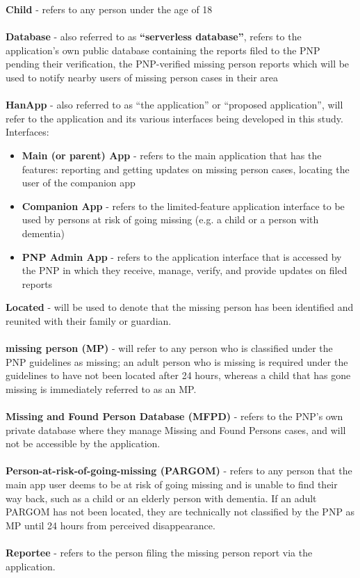 \textbf{Child} - refers to any person under the age of 18 \\ \\ 
\textbf{Database} - also referred to as \textbf{“serverless database”}, refers to the application’s own public database containing the reports filed to the PNP pending their verification, the PNP-verified missing person reports which will be used to notify nearby users of missing person cases in their area \\ \\
\textbf{HanApp} - also referred to as “the application” or “proposed application”, will refer to the application and its various interfaces being developed in this study. Interfaces:
\begin{itemize}
    \item \textbf{Main (or parent) App} - refers to the main application that has the features: reporting and getting updates on missing person cases, locating the user of the companion app
    \item \textbf{Companion App} - refers to the limited-feature application interface to be used by persons at risk of going missing (e.g. a child or a person with dementia)
    \item \textbf{PNP Admin App} - refers to the application interface that is accessed by the PNP in which they receive, manage, verify, and provide updates on filed reports
\end{itemize}
\textbf{Located} - will be used to denote that the missing person has been identified and reunited with their family or guardian.\\\\
\textbf{missing person (MP)} - will refer to any person who is classified under the PNP guidelines as missing; an adult person who is missing is required under the guidelines to have not been located after 24 hours, whereas a child that has gone missing is immediately referred to as an MP.\\\\
\textbf{Missing and Found Person Database (MFPD)} - refers to the PNP’s own private database where they manage Missing and Found Persons cases, and will not be accessible by the application.\\\\
\textbf{Person-at-risk-of-going-missing (PARGOM)} - refers to any person that the main app user deems to be at risk of going missing and is unable to find their way back, such as a child or an elderly person with dementia. If an adult PARGOM has not been located, they are technically not classified by the PNP as MP until 24 hours from perceived disappearance.\\\\
\textbf{Reportee} - refers to the person filing the missing person report via the application.

